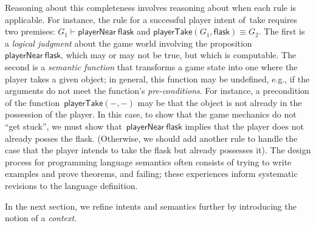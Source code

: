 Reasoning about this completeness involves reasoning about when each
rule is applicable.  
%
For instance, the rule for a successful player intent of~\textsf{take}
requires two premises:
$G_1 \vdash \textsf{playerNear}~\textsf{flask}$
and
$\textsf{playerTake}(G_1,\textsf{flask}) \equiv G_2$.
%
The first is a \emph{logical judgment} about the game world involving
the proposition~$\textsf{playerNear}~\textsf{flask}$, which may or
may not be true, but which is computable.
%
The second is a \emph{semantic function} that transforms a game state
into one where the player takes a given object; in general, this
function may be undefined, e.g., if the arguments do not meet the
function's \emph{pre-conditions}.
%
For instance, a precondition of the
function~$\textsf{playerTake}(-,-)$ may be that the object is not
already in the possession of the player.
%
In this case, to show that the game mechanics do not ``get stuck'', we
must show that~$\textsf{playerNear}~\textsf{flask}$ implies that the
player does not already posses the flask.
%
(Otherwise, we should add another rule to handle the case that the
player intends to take the flask but already possesses it).
%
The design process for programming language semantics often consists
of trying to write examples and prove theorems, and failing; these
experiences inform systematic revisions to the language definition.

In the next section, we refine intents and semantics further by
introducing the notion of a \emph{context}.


